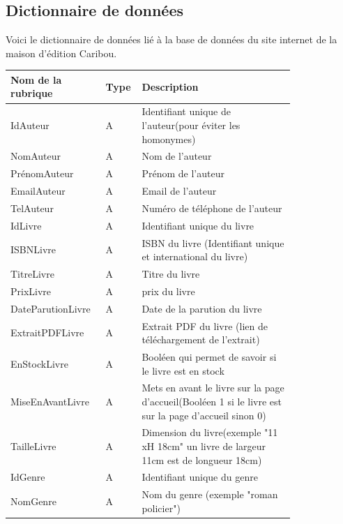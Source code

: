 \documentclass[14pt]{extarticle}
\begin{document}
\subsection{Dictionnaire de données}
Voici le dictionnaire de données lié à la base de données du site internet de la maison d'édition Caribou.
\begin{center}
    \begin{longtable}{|p{0.25\linewidth}|p{0.06\linewidth}|p{0.50\linewidth}|}
        \hline
        \textbf{Nom de la rubrique} & \textbf{Type} & \textbf{Description} \\
        \hline 
        \hline
        IdAuteur & A & Identifiant unique de l'auteur(pour éviter les homonymes) \\
        \hline
        NomAuteur & A & Nom de l'auteur \\
        \hline
        PrénomAuteur & A & Prénom de l'auteur \\
        \hline
        EmailAuteur & A & Email de l'auteur \\
        \hline
        TelAuteur & A & Numéro de téléphone de l'auteur \\
        \hline
        IdLivre & A & Identifiant unique du livre \\
        \hline
        ISBNLivre & A & ISBN du livre (Identifiant unique et international du livre) \\
        \hline
        TitreLivre & A & Titre du livre \\
        \hline
        PrixLivre & A & prix du livre \\
        \hline
        DateParutionLivre & A & Date de la parution du livre \\
        \hline
        ExtraitPDFLivre & A & Extrait PDF du livre (lien de téléchargement de l'extrait) \\
        \hline
        EnStockLivre & A &  Booléen qui permet de savoir si le livre est en stock \\
        \hline
        MiseEnAvantLivre & A & Mets en avant le livre sur la page d'accueil(Booléen 1 si le livre est sur la page d'accueil sinon 0)\\
        \hline
        TailleLivre & A & Dimension du livre(exemple "11 xH 18cm" un livre de largeur 11cm est de longueur 18cm) \\
        \hline
        IdGenre & A & Identifiant unique du genre \\
        \hline
        NomGenre & A & Nom du genre (exemple "roman policier") \\

\end{longtable}
\end{center}
\end{document}
